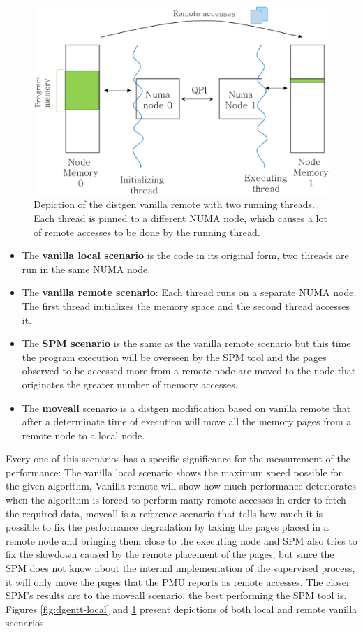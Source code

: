 \begin{figure}[th]
	\centering
		\includegraphics[width=.8\textwidth]{figures/distgentt-remote.eps}
		\caption[Depiction of the working of the distgen vanilla remote scenario with two threads]{Depiction of the distgen vanilla remote with two running threads. Each thread is pinned to a different NUMA node, which causes a lot of remote accesses to be done by the running thread.}
		\label{fig:dgentt-remote}
\end{figure}

\begin{itemize}
	\item The \textbf{vanilla local scenario} is the code in its original form, two threads are run in the same NUMA node.
	\item The \textbf{vanilla remote scenario}: Each thread runs on a separate NUMA node. The first thread initializes the memory space and the second thread accesses it. 
	\item The \textbf{SPM scenario} is the same as the vanilla remote scenario but this time the program execution will be overseen by the SPM tool and the pages observed to be accessed more from a remote node are moved to the node that originates the greater number of memory accesses.
	\item The \textbf{moveall} scenario is a distgen modification based on vanilla remote that after a determinate time of execution will move all the memory pages from a remote node to a local node.
\end{itemize}

Every one of this scenarios has a specific significance for the measurement of the performance: The vanilla local scenario shows the maximum speed possible for the given algorithm, Vanilla remote will show how much performance deteriorates when the algorithm is forced to perform many remote accesses in order to fetch the required data, moveall is a reference scenario that tells how much it is possible to fix the performance degradation by taking the pages placed in a remote node and bringing them close to the executing node and SPM also tries to fix the slowdown caused by the remote placement of the pages, but since the SPM does not know about the internal implementation of the supervised process, it will only move the pages that the PMU reports as remote accesses. The closer SPM's results are to the moveall scenario, the best performing the SPM tool is. Figures \ref{fig:dgentt-local} and \ref{fig:dgentt-remote} present depictions of both local and remote vanilla scenarios.


